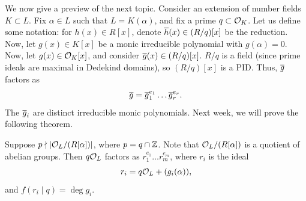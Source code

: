 We now give a preview of the next topic. Consider an extension of number fields $K \subset L$. Fix $\alpha \in L$ such that $L = K(\alpha)$, and fix a prime $q \subset \mathcal O_K$. Let us define some notation: for $h(x) \in R[x]$, denote $\overline h(x) \in (R/q)[x]$ be the reduction. Now, let $g(x) \in K[x]$ be a monic irreducible polynomial with $g(\alpha) = 0$. Now, let $g(x) \in \mathcal O_K[x]$, and consider $\overline g(x) \in (R/q)[x]$. $R/q$ is a field (since prime ideals are maximal in Dedekind domains), so $(R/q)[x]$ is a PID. Thus, $\overline g$ factors as
\[ \overline g = \overline g_1^{e_1} \dots \overline g_r^{e_r}. \]
The $\overline g_i$ are distinct irreducible monic polynomials. Next week, we will prove the following theorem.
\begin{theorem*}
    Suppose $p \nmid \left\lvert \mathcal O_L / (R[\alpha]) \right\rvert$, where $p = q \cap \mathbb Z$. Note that $\mathcal O_L / (R[\alpha])$ is a quotient of abelian groups. Then $q \mathcal O_L$ factors as $r_1^{e_1} \dots r_m^{e_m}$, where $r_i$ is the ideal
    \[ r_i = q \mathcal O_L + (g_i(\alpha)), \]
    and $f(r_i \mid q) = \deg g_i$.
\end{theorem*}